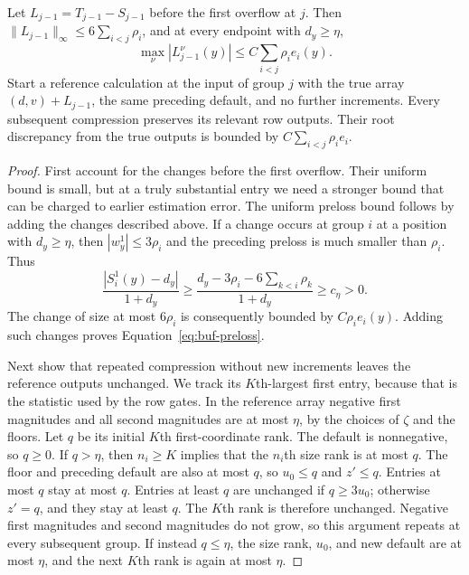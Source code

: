 \begin{lemma}
\label{lem:buf-reference}
Let $L_{j-1}=T_{j-1}-S_{j-1}$ before the first overflow at $j$.
Then $\|L_{j-1}\|_\infty\leq6\sum_{i<j}\rho_i$, and at every endpoint
with $d_y\geq\eta$,
\begin{equation}
 \max_\nu|L_{j-1}^\nu(y)|
       \leq C\sum_{i<j}\rho_i e_i(y).
 \label{eq:buf-preloss}
\end{equation}
Start a reference calculation at the input of group $j$ with the true
array $(d,v)+L_{j-1}$, the same preceding default, and no further
increments.  Every subsequent compression preserves its relevant row
outputs.  Their root discrepancy from the true outputs is bounded by
$C\sum_{i<j}\rho_i e_i$.
\end{lemma}
\begin{proof}
First account for the changes before the first overflow. Their uniform bound is small, but at a truly substantial entry we need a stronger bound that can be charged to earlier estimation error. The uniform preloss bound follows by adding the changes described above.
If a change occurs at group $i$ at a position with $d_y\geq\eta$, then
$|w_y^1|\leq3\rho_i$ and the preceding preloss is much smaller than
$\rho_i$.  Thus
\[
 \frac{|S_i^1(y)-d_y|}{1+d_y}
 \geq \frac{d_y-3\rho_i-6\sum_{k<i}\rho_k}{1+d_y}
 \geq c_\eta>0.
\]
The change of size at most $6\rho_i$ is consequently bounded by
$C\rho_i e_i(y)$.  Adding such changes proves
Equation~\eqref{eq:buf-preloss}.

Next show that repeated compression without new increments leaves the reference outputs unchanged. We track its $K$th-largest first entry, because that is the statistic used by the row gates. In the reference array negative first magnitudes and all second magnitudes
are at most $\eta$, by the choices of $\zeta$ and the floors.
Let $q$ be its initial $K$th first-coordinate rank.  The default is
nonnegative, so $q\geq0$.  If $q>\eta$, then $n_i\geq K$ implies that the
$n_i$th size rank is at most $q$.  The floor and preceding default are
also at most $q$, so $u_0\leq q$ and $z'\leq q$.  Entries at most $q$
stay at most $q$.  Entries at least $q$ are unchanged if $q\geq3u_0$;
otherwise $z'=q$, and they stay at least $q$.  The $K$th rank is therefore
unchanged.  Negative first magnitudes and second magnitudes do not grow,
so this argument repeats at every subsequent group.  If instead $q\leq\eta$,
the size rank, $u_0$, and new default are at most $\eta$, and the next
$K$th rank is again at most $\eta$.


\end{proof}
